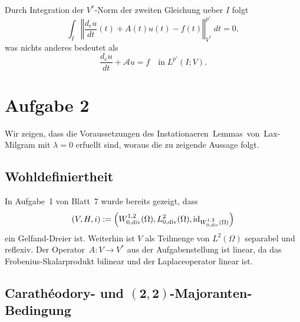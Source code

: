 \documentclass{article}
\begin{document}
Durch Integration der $V^*$-Norm der zweiten Gleichung ueber $I$ folgt
\begin{equation*}
  \int_{I} {\left\Vert \frac{d_e u}{dt}(t) + A(t) u(t) - f(t) \right\Vert}_{V^*}^{p'} \ dt
  = 0,
\end{equation*}
was nichts anderes bedeutet als
\begin{equation*}
  \frac{d_e u}{dt} + \mathcal{A} u = f \quad \text{in} \; L^{p'}(I; V).
\end{equation*}

\section*{Aufgabe 2}

Wir zeigen, dass die Voraussetzungen des Instationaeren~Lemmas~von~Lax-Milgram mit $\lambda=0$ erfuellt sind, woraus die zu zeigende Aussage folgt.

\subsection*{Wohldefiniertheit}

In Aufgabe~1 von Blatt~7 wurde bereits gezeigt, dass
\begin{equation*}
  (V, H, i)
  :=
  \left(W_{0, \operatorname{div}}^{1,2}(\Omega), L_{0, \operatorname{div}}^2(\Omega), \operatorname{id}_{W_{0, \operatorname{div}}^{1,2}(\Omega)}\right)
\end{equation*}
ein Gelfand-Dreier ist. Weiterhin ist $V$ als Teilmenge von $L^2(\Omega)$ separabel und reflexiv. Der Operator~$A: V \rightarrow V^*$ aus der Aufgabenstellung ist linear, da das Frobenius-Skalarprodukt bilinear und der Laplaceoperator linear ist.

\subsection*{Carath\'eodory- und $\bm{(2, 2)}$-Majoranten-Bedingung}
\end{document}
